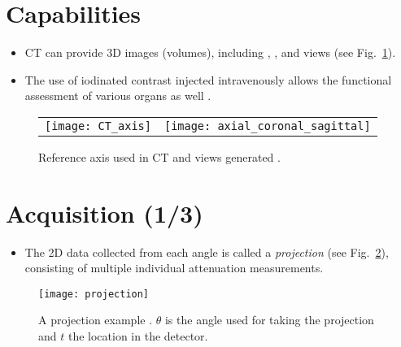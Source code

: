 \section{Capabilities}
\begin{itemize}
\item CT can provide  3D images (volumes), including
  , , and 
  views (see Fig.~\ref{fig:views_in_CT}).
\item The use of
  iodinated contrast injected intravenously allows the functional
  assessment of various organs as well \cite{bushberg2011essential}.
\end{itemize}
\vspace{-4ex}
\begin{figure}[!b]
  \centering
  \begin{tabular}{cc}
    \texttt{[image: CT\_axis]} & \texttt{[image: axial\_coronal\_sagittal]}
  \end{tabular}
  \caption{Reference axis used in CT and views generated
    \cite{morin2025radiation}.\label{fig:views_in_CT}}
\end{figure}

\section{Acquisition (1/3)}
\begin{itemize}
\item The 2D data collected from each angle is called a \emph{projection}
(see Fig.~\ref{fig:projection}), consisting of multiple individual
attenuation measurements.
\end{itemize}
\vspace{-5ex}
\begin{figure}[!b]
  \centering
  \texttt{[image: projection]}
  \caption{A projection example \cite{takase2025CT}. $\theta$ is the
    angle used for taking the projection and $t$ the location in
    the detector.\label{fig:projection}}
\end{figure}

